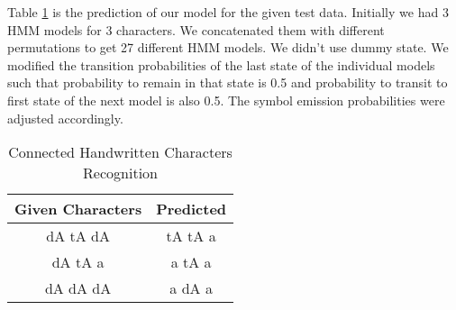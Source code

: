 Table \ref{table:4} is the prediction of our model for the given test data. Initially we had 3 HMM models for 3 characters. We concatenated them with different permutations to get 27 different HMM models. We didn't use dummy state. We modified the transition probabilities of the last state of the individual models such that probability to remain in that state is 0.5 and probability to transit to first state of the next model is also 0.5. The symbol emission probabilities were adjusted accordingly.
\begin{table}[h!]
\centering

\begin{tabular}{|c|c|}\hline

Given Characters & Predicted\\ \hline\hline
dA tA dA & tA tA a \\ \hline
dA tA a & a tA a \\ \hline
dA dA dA & a dA a \\\hline

\end{tabular}
\caption{Connected Handwritten Characters Recognition}
\label{table:4}
\end{table}

